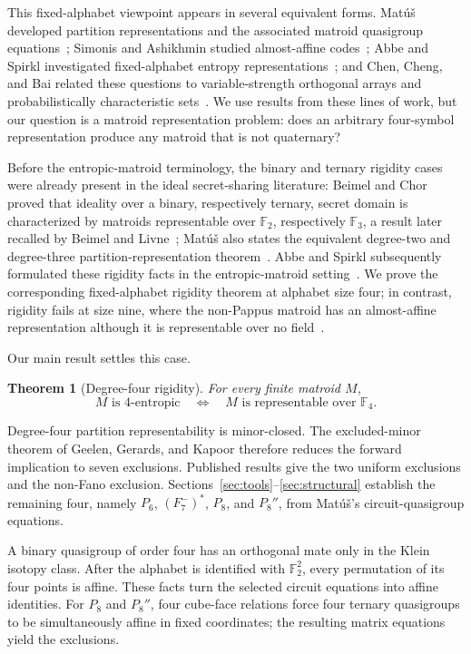 \documentclass[preprint,12pt]{elsarticle}
\newtheorem{theorem}{Theorem}[section]
\theoremstyle{definition}
\newcommand{\F}{\mathbb F}
\begin{document}
This fixed-alphabet viewpoint appears in several equivalent forms. Mat\'u\v{s} developed partition representations and the associated matroid quasigroup equations~\cite{Matus1999}; Simonis and Ashikhmin studied almost-affine codes~\cite{SimonisAshikhmin1998}; Abbe and Spirkl investigated fixed-alphabet entropy representations~\cite{AbbeSpirkl2019}; and Chen, Cheng, and Bai related these questions to variable-strength orthogonal arrays and probabilistically characteristic sets~\cite{ChenChengBai2021,ChenChengBai2025}. We use results from these lines of work, but our question is a matroid representation problem: does an arbitrary four-symbol representation produce any matroid that is not quaternary?

Before the entropic-matroid terminology, the binary and ternary rigidity cases were already present in the ideal secret-sharing literature: Beimel and Chor proved that ideality over a binary, respectively ternary, secret domain is characterized by matroids representable over $\F_2$, respectively $\F_3$, a result later recalled by Beimel and Livne~\cite{BeimelChor1994,BeimelLivne2008}; Mat\'u\v{s} also states the equivalent degree-two and degree-three partition-representation theorem~\cite{Matus1999}. Abbe and Spirkl subsequently formulated these rigidity facts in the entropic-matroid setting~\cite{AbbeSpirkl2019}. We prove the corresponding fixed-alphabet rigidity theorem at alphabet size four; in contrast, rigidity fails at size nine, where the non-Pappus matroid has an almost-affine representation although it is representable over no field~\cite{SimonisAshikhmin1998}.

Our main result settles this case.

\begin{theorem}[Degree-four rigidity]\label{thm:main}
For every finite matroid $M$,
\[
M\text{ is $4$-entropic}
\quad\Longleftrightarrow\quad
M\text{ is representable over }\F_4.
\]
\end{theorem}

Degree-four partition representability is minor-closed. The excluded-minor theorem of Geelen, Gerards, and Kapoor therefore reduces the forward implication to seven exclusions. Published results give the two uniform exclusions and the non-Fano exclusion. Sections~\ref{sec:tools}--\ref{sec:structural} establish the remaining four, namely $P_6$, $(F_7^-)^*$, $P_8$, and $P_8''$, from Mat\'u\v{s}'s circuit-quasigroup equations.

A binary quasigroup of order four has an orthogonal mate only in the Klein isotopy class. After the alphabet is identified with $\F_2^2$, every permutation of its four points is affine. These facts turn the selected circuit equations into affine identities. For $P_8$ and $P_8''$, four cube-face relations force four ternary quasigroups to be simultaneously affine in fixed coordinates; the resulting matrix equations yield the exclusions.
\end{document}

